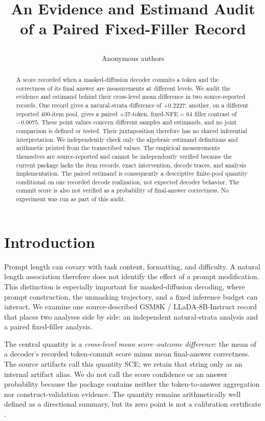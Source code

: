 \documentclass{article}
\title{\raggedright An Evidence and Estimand Audit\\
of a Paired Fixed-Filler Record}
\author{Anonymous authors}
\date{}
\begin{document}
\maketitle
{}

\begin{abstract}
A score recorded when a masked-diffusion decoder commits a token and the
correctness of its final answer are measurements at different levels.  We audit the
evidence and estimand behind their cross-level mean difference in two source-reported
records.  One record gives a natural-strata difference of $+0.2227$; another, on a
different reported $400$-item pool, gives a paired $+37$-token,
fixed-$\mathrm{NFE}{=}64$ filler contrast of $-0.0075$.  These point values concern
different samples and estimands, and no joint comparison is defined or tested.  Their
juxtaposition therefore has no shared inferential interpretation.  We independently check only
the algebraic estimand definitions and arithmetic printed from the transcribed values.
The empirical measurements themselves are source-reported and cannot be independently
verified because the current package lacks the item records, exact intervention,
decode traces, and analysis implementation.  The paired estimand is consequently a
descriptive finite-pool quantity conditional on one recorded decode realization, not
expected decoder behavior.  The commit score is also not verified as a probability of
final-answer correctness.  No experiment was run as part of this audit.
\end{abstract}

\section{Introduction}
\label{sec:intro}

Prompt length can covary with task content, formatting, and difficulty.  A natural
length association therefore does not identify the effect of a prompt modification.
This distinction is especially important for masked-diffusion decoding, where
prompt construction, the unmasking trajectory, and a fixed inference budget can interact.
We examine one source-described GSM8K \citep{cobbe2021gsm8k} /
LLaDA-8B-Instruct \citep{nie2025large} record that places two analyses side by side:
an independent natural-strata analysis and a paired fixed-filler analysis.

The central quantity is a \emph{cross-level mean score--outcome difference}: the mean
of a decoder's recorded token-commit score minus mean final-answer correctness.  The
source artifacts call this quantity SCE; we retain that string only as an internal
artifact alias.  We do not call the score confidence or an answer probability because
the package contains neither the token-to-answer aggregation nor construct-validation
evidence.  The quantity remains arithmetically well defined as a directional summary,
but its zero point is not a calibration certificate
\citep{ao2023miscalibration,seligmann2023beyond,cruz2024riskscores}.
\end{document}
